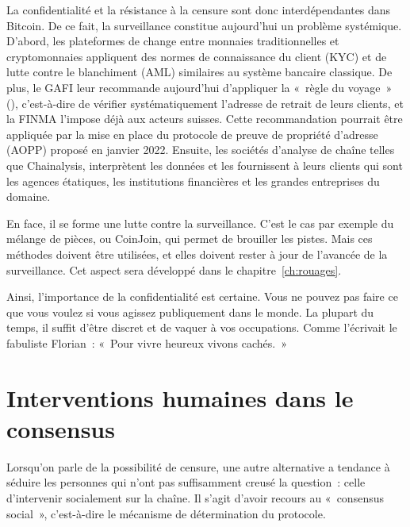 La confidentialité et la résistance à la censure sont donc interdépendantes dans Bitcoin. De ce fait, la surveillance constitue aujourd'hui un problème systémique. D'abord, les plateformes de change entre monnaies traditionnelles et cryptomonnaies appliquent des normes de connaissance du client (KYC) et de lutte contre le blanchiment (AML) similaires au système bancaire classique. De plus, le GAFI leur recommande aujourd'hui d'appliquer la «~règle du voyage~» (), c'est-à-dire de vérifier systématiquement l'adresse de retrait de leurs clients, et la FINMA l'impose déjà aux acteurs suisses. Cette recommandation pourrait être appliquée par la mise en place du protocole de preuve de propriété d'adresse (AOPP) proposé en janvier 2022. Ensuite, les sociétés d'analyse de chaîne telles que Chainalysis, interprètent les données et les fournissent à leurs clients qui sont les agences étatiques, les institutions financières et les grandes entreprises du domaine.

En face, il se forme une lutte contre la surveillance. C'est le cas par exemple du mélange de pièces, ou CoinJoin, qui permet de brouiller les pistes. Mais ces méthodes doivent être utilisées, et elles doivent rester à jour de l'avancée de la surveillance. Cet aspect sera développé dans le chapitre~\ref{ch:rouages}.

Ainsi, l'importance de la confidentialité est certaine. Vous ne pouvez pas faire ce que vous voulez si vous agissez publiquement dans le monde. La plupart du temps, il suffit d'être discret et de vaquer à vos occupations. Comme l'écrivait le fabuliste Florian~: «~Pour vivre heureux vivons cachés.~»

\section*{Interventions humaines dans le consensus}

Lorsqu'on parle de la possibilité de censure, une autre alternative a tendance à séduire les personnes qui n'ont pas suffisamment creusé la question~: celle d'intervenir socialement sur la chaîne. Il s'agit d'avoir recours au «~consensus social~», c'est-à-dire le mécanisme de détermination du protocole.

